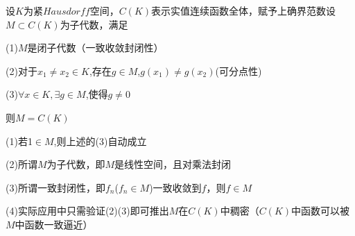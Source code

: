 \documentclass[lang=cn,10pt]{elegantbook}
\begin{document}
	\begin{theorem}
		设$K$为紧$Hausdorff$空间，$C(K)$表示实值连续函数全体，赋予上确界范数设$M \subset C(K)$为子代数，满足
		
		(1)$M$是闭子代数（一致收敛封闭性）
		
		(2)对于$x_{1}\ne x_{2} \in K$,存在$g\in M$,$g(x_{1})\ne g(x_{2})$(可分点性)
		
		(3)$\forall x \in K ,\exists g \in M$,使得$g\ne 0$
		
		则$M=C(K)$
	\end{theorem}
	\begin{remark}
		
		(1)若1$\in$$M$,则上述的(3)自动成立
		
		(2)所谓$M$为子代数，即$M$是线性空间，且对乘法封闭
		
		(3)所谓一致封闭性，即$f_{n}$($f_{n}\in  M$)一致收敛到$f$，则$f\in M$
		
		(4)实际应用中只需验证(2)(3)即可推出$M$在$C(K)$中稠密（$C(K)$中函数可以被$M$中函数一致逼近）
	\end{remark}
\end{document}
